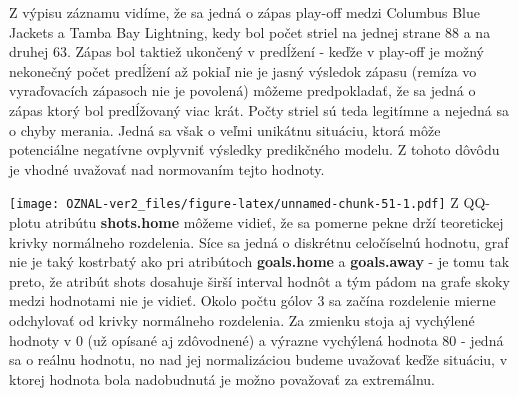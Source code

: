 \documentclass[
]{article}
\newenvironment{Shaded}{\begin{snugshade}}{\end{snugshade}}
\newcommand{\AttributeTok}[1]{\textcolor[rgb]{0.77,0.63,0.00}{#1}}
\newcommand{\DecValTok}[1]{\textcolor[rgb]{0.00,0.00,0.81}{#1}}
\newcommand{\FunctionTok}[1]{\textcolor[rgb]{0.00,0.00,0.00}{#1}}
\newcommand{\NormalTok}[1]{#1}
\newcommand{\SpecialCharTok}[1]{\textcolor[rgb]{0.00,0.00,0.00}{#1}}
\newcommand{\StringTok}[1]{\textcolor[rgb]{0.31,0.60,0.02}{#1}}
\begin{document}
Z výpisu záznamu vidíme, že sa jedná o zápas play-off medzi Columbus
Blue Jackets a Tamba Bay Lightning, kedy bol počet striel na jednej
strane 88 a na druhej 63. Zápas bol taktiež ukončený v predĺžení - keďže
v play-off je možný nekonečný počet predĺžení až pokiaľ nie je jasný
výsledok zápasu (remíza vo vyraďovacích zápasoch nie je povolená) môžeme
predpokladať, že sa jedná o zápas ktorý bol predĺžovaný viac krát. Počty
striel sú teda legitímne a nejedná sa o chyby merania. Jedná sa však o
veľmi unikátnu situáciu, ktorá môže potenciálne negatívne ovplyvniť
výsledky predikčného modelu. Z tohoto dôvôdu je vhodné uvažovať nad
normovaním tejto hodnoty.

\begin{Shaded}
\end{Shaded}

\texttt{[image: OZNAL-ver2\_files/figure-latex/unnamed-chunk-51-1.pdf]} Z
QQ-plotu atribútu \textbf{shots.home} môžeme vidieť, že sa pomerne pekne
drží teoretickej krivky normálneho rozdelenia. Síce sa jedná o diskrétnu
celočíselnú hodnotu, graf nie je taký kostrbatý ako pri atribútoch
\textbf{goals.home} a \textbf{goals.away} - je tomu tak preto, že
atribút shots dosahuje širší interval hodnôt a tým pádom na grafe skoky
medzi hodnotami nie je vidieť. Okolo počtu gólov 3 sa začína rozdelenie
mierne odchylovať od krivky normálneho rozdelenia. Za zmienku stoja aj
vychýlené hodnoty v 0 (už opísané aj zdôvodnené) a výrazne vychýlená
hodnota 80 - jedná sa o reálnu hodnotu, no nad jej normalizáciou budeme
uvažovať keďže situáciu, v ktorej hodnota bola nadobudnutá je možno
považovať za extremálnu.

\begin{Shaded}
\end{Shaded}
\end{document}

